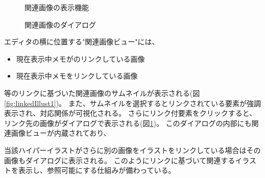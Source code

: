 \begin{figure}[htbp] \begin{minipage}{0.5\hsize}
                         \begin{center} 
                         \end{center} \caption{関連画像の表示機能} \label{fig:linkedIllust1}
\end{minipage} \begin{minipage}{0.5\hsize}
                   \begin{center} 
                   \end{center} \caption{関連画像のダイアログ} \label{fig:linkedIllust2}
\end{minipage}
\end{figure}

エディタの横に位置する"関連画像ビュー"には、
\begin{itemize}
    \item 現在表示中メモがのリンクしている画像
    \item 現在表示中メモをリンクしている画像
\end{itemize}等のリンクに基づいた関連画像のサムネイルが表示される(図\ref{fig:linkedIllust1})。
また、サムネイルを選択するとリンクされている要素が強調表示され、対応関係が可視化される。
さらにリンク付要素をクリックすると、リンク先の画像がダイアログで表示される(図\ref{fig:linkedIllust2})。
このダイアログの内部にも関連画像ビューが内蔵されており、%

当該ハイパーイラストがさらに別の画像をイラストをリンクしている場合はその画像もダイアログに表示される。
このようにリンクに基づいて関連するイラストを表示し、参照可能にする仕組みが備わっている。

